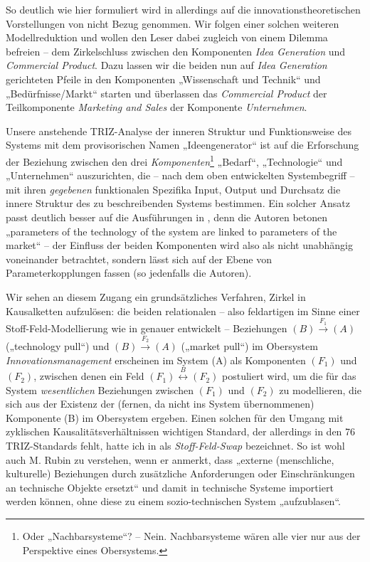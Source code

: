 \documentclass[11pt,a4paper]{article}
\begin{document}
So deutlich wie hier formuliert wird in \cite{TESE2018} allerdings auf die
innovationstheoretischen Vorstellungen von \cite{Preez2006} nicht Bezug
genommen.  Wir folgen einer solchen weiteren Modellreduktion und wollen den
Leser dabei zugleich von einem Dilemma befreien -- dem Zirkelschluss zwischen
den Komponenten \emph{Idea Generation} und \emph{Commercial Product}.  Dazu
lassen wir die beiden nun auf \emph{Idea Generation} gerichteten Pfeile in den
Komponenten „Wissenschaft und Technik“ und „Bedürfnisse/Markt“ starten und
überlassen das \emph{Commercial Product} der Teilkomponente \emph{Marketing
  and Sales} der Komponente \emph{Unternehmen}.

Unsere anstehende TRIZ-Analyse der inneren Struktur und Funktionsweise des
Systems mit dem provisorischen Namen „Ideengenerator“ ist auf die Erforschung
der Beziehung zwischen den drei \emph{Komponenten}\footnote{Oder
  „Nachbarsysteme“?  -- Nein. Nachbarsysteme wären alle vier nur aus der
  Perspektive eines Obersystems.} „Bedarf“, „Technologie“ und „Unternehmen“
auszurichten, die -- nach dem oben entwickelten Systembegriff -- mit ihren
\emph{gegebenen} funktionalen Spezifika Input, Output und Durchsatz die innere
Struktur des zu beschreibenden Systems bestimmen.  Ein solcher Ansatz passt
deutlich besser auf die Ausführungen in \cite[Kap. 1]{TESE2018}, denn die
Autoren betonen „parameters of the technology of the system are linked to
parameters of the market“ -- der Einfluss der beiden Komponenten wird also als
nicht unabhängig voneinander betrachtet, sondern lässt sich auf der Ebene von
Parameterkopplungen fassen (so jedenfalls die Autoren).

Wir sehen an diesem Zugang ein grundsätzliches Verfahren, Zirkel in
Kausalketten aufzulösen: die beiden relationalen -- also feldartigen im Sinne
einer Stoff-Feld-Modellierung wie in \cite[Kap. 4.9]{KS2017} genauer
entwickelt -- Beziehungen $(B)\stackrel{F_1}{\longrightarrow} (A)$
(„technology pull“) und $(B) \stackrel{F_2}{\longrightarrow} (A)$ („market
pull“) im Obersystem \emph{Innovationsmanagement} erscheinen im System (A) als
Komponenten $(F_1)$ und $(F_2)$, zwischen denen ein Feld
$(F_1)\stackrel{B}{\longleftrightarrow}(F_2)$ postuliert wird, um die für das
System \emph{wesentlichen} Beziehungen zwischen $(F_1)$ und $(F_2)$ zu
modellieren, die sich aus der Existenz der (fernen, da nicht ins System
übernommenen) Komponente (B) im Obersystem ergeben.  Einen solchen für den
Umgang mit zyklischen Kausalitätsverhältnissen wichtigen Standard, der
allerdings in den 76 TRIZ-Standards fehlt, hatte ich in \cite{Graebe2019a} als
\emph{Stoff-Feld-Swap} bezeichnet.  So ist wohl auch M. Rubin zu verstehen,
wenn er anmerkt, dass „externe (menschliche, kulturelle) Beziehungen durch
zusätzliche Anforderungen oder Einschränkungen an technische Objekte ersetzt“
und damit in technische Systeme importiert werden können, ohne diese zu einem
sozio-technischen System „aufzublasen“.
\end{document}
